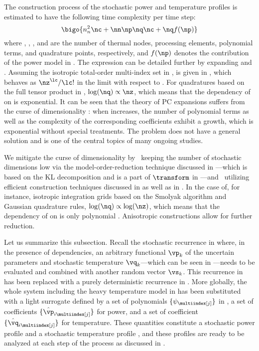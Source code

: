 The construction process of the stochastic power and temperature profiles is
estimated to have the following time complexity per time step:
\[
  \bigo{n_n^2 \nc + \nn \np \nq \nc + \nq f(\np)}
\]
where \nn, \np, \nc, and \nq are the number of thermal nodes, processing
elements, polynomial terms, and quadrature points, respectively, and $f(\np)$
denotes the contribution of the power model in . The
expression can be detailed further by expanding \nc and \nq. Assuming the
isotropic total-order multi-index set in , \nc
is given in , which behaves as $\nz^\lc
/ \lc!$ in the limit with respect to \nz. For quadratures based on the full
tensor product in , $\log(\nq) \propto \nz$, which
means that the dependency of \nq on \nz is exponential. It can be seen that the
theory of \ac{PC} expansions suffers from the curse of dimensionality
\cite{eldred2008, xiu2010}: when \nz increases, the number of polynomial terms
as well as the complexity of the corresponding coefficients exhibit a growth,
which is exponential without special treatments. The problem does not have a
general solution and is one of the central topics of many ongoing studies.

We mitigate the curse of dimensionality by \one~keeping the number of stochastic
dimensions low via the model-order-reduction technique discussed in
---which is based on the \ac{KL} decomposition
and is a part of $\transform$ in ---and \two~utilizing
efficient construction techniques discussed in  as
well as in . In the case of, for instance,
isotropic integration grids based on the Smolyak algorithm and Gaussian
quadrature rules, $\log(\nq) \propto \log(\nz)$, which means that the dependency
of \nq on \nz is only polynomial \cite{heiss2008}. Anisotropic constructions
allow for further reduction.

Let us summarize this subsection. Recall the stochastic recurrence in
 where, in the presence of dependencies, an
arbitrary functional $\vp_k$ of the uncertain parameters \vu and stochastic
temperature $\vq_k$---which can be seen in ---needs to
be evaluated and combined with another random vector $\vs_k$. This recurrence in
 has been replaced with a purely deterministic
recurrence in . More globally, the whole system including
the heavy temperature model in  has been
substituted with a light surrogate defined by a set of polynomials $\{
\psi_{\multiindex[j]} \}$ in \vz, a set of coefficients $\{ \hat{\vp}_{i
\multiindex[j]} \}$ for power, and a set of coefficient $\{ \hat{\vq}_{i
\multiindex[j]} \}$ for temperature. These quantities constitute a stochastic
power profile \mp and a stochastic temperature profile \mq, and these profiles
are ready to be analyzed at each step of the process as discussed in
.

